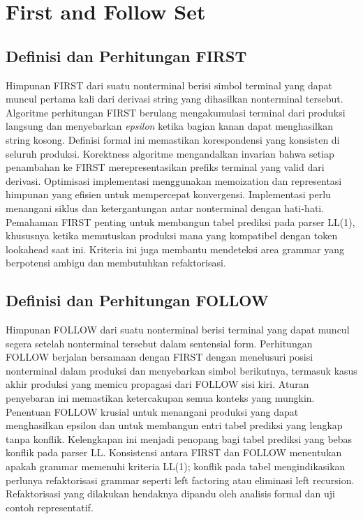 \documentclass[../main.tex]{subfiles}
\begin{document}
\chapter{First and Follow Set}
\label{ch:first-follow}

\section{Definisi dan Perhitungan FIRST}
Himpunan FIRST dari suatu nonterminal berisi simbol terminal yang dapat muncul pertama kali dari derivasi string yang dihasilkan nonterminal tersebut. Algoritme perhitungan FIRST berulang mengakumulasi terminal dari produksi langsung dan menyebarkan \textit{epsilon} ketika bagian kanan dapat menghasilkan string kosong.\cite{aho-dragon-book-2006} Definisi formal ini memastikan korespondensi yang konsisten di seluruh produksi.
Korektness algoritme mengandalkan invarian bahwa setiap penambahan ke FIRST merepresentasikan prefiks terminal yang valid dari derivasi. Optimisasi implementasi menggunakan memoization dan representasi himpunan yang efisien untuk mempercepat konvergensi.\cite{grune-parsing} Implementasi perlu menangani siklus dan ketergantungan antar nonterminal dengan hati-hati.
Pemahaman FIRST penting untuk membangun tabel prediksi pada parser LL(1), khususnya ketika memutuskan produksi mana yang kompatibel dengan token lookahead saat ini. Kriteria ini juga membantu mendeteksi area grammar yang berpotensi ambigu dan membutuhkan refaktorisasi.

\section{Definisi dan Perhitungan FOLLOW}
Himpunan FOLLOW dari suatu nonterminal berisi terminal yang dapat muncul segera setelah nonterminal tersebut dalam sentensial form. Perhitungan FOLLOW berjalan bersamaan dengan FIRST dengan menelusuri posisi nonterminal dalam produksi dan menyebarkan simbol berikutnya, termasuk kasus akhir produksi yang memicu propagasi dari FOLLOW sisi kiri.\cite{aho-dragon-book-2006} Aturan penyebaran ini memastikan ketercakupan semua konteks yang mungkin.
Penentuan FOLLOW krusial untuk menangani produksi yang dapat menghasilkan epsilon dan untuk membangun entri tabel prediksi yang lengkap tanpa konflik.\cite{grune-parsing} Kelengkapan ini menjadi penopang bagi tabel prediksi yang bebas konflik pada parser LL.
Konsistensi antara FIRST dan FOLLOW menentukan apakah grammar memenuhi kriteria LL(1); konflik pada tabel mengindikasikan perlunya refaktorisasi grammar seperti left factoring atau eliminasi left recursion. Refaktorisasi yang dilakukan hendaknya dipandu oleh analisis formal dan uji contoh representatif.

\IfSubfilesClassLoaded{%
\printbibliography
}{}
\end{document}
